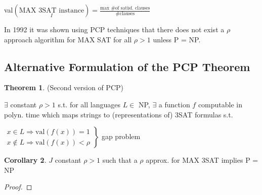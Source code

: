 \documentclass[11pt]{article}
\theoremstyle{definition}
\newtheorem{theorem}{Theorem}[section]
\newtheorem{corollary}[theorem]{Corollary}
\theoremstyle{definition}
\begin{document}
val$( \underset{I}{\text{MAX 3SAT instance}}) = \frac{\text{max \# of satisf. clauses}}{\#\text{clauses}} $

In 1992 it was shown using PCP techniques that there does not exist a $ \rho $ approach algorithm for MAX SAT for all $ \rho > 1 $ unless P = NP. \newline

\subsection{Alternative Formulation of the PCP Theorem}

\begin{theorem}
(Second version of PCP)

$ \exists $ constant $ \rho > 1$ s.t. for all languages $ L \in $ NP, $ \exists $ a function $ f $ computable in polyn. time which maps strings to (representations of) 3SAT formulas s.t.

$ \left. \begin{array}{l} x \in L \Rightarrow \text{val}(f(x)) = 1 \\
x \not \in L \Rightarrow \text{val}(f(x)) < \rho \end{array}
\right\} $
gap problem
\end{theorem}

\begin{corollary}
$ J $ constant $ \rho > 1 $ such that a $ \rho $ approx. for MAX 3SAT implies P = NP
\end{corollary}

\begin{proof}


\end{proof}
\end{document}
